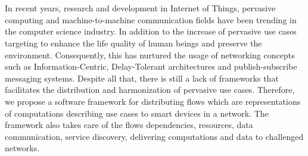 \chapter{\abstractname}
In recent years, research and development in Internet of Things, pervasive computing and machine-to-machine communication fields have been trending  in the computer science industry. In addition to the increase of pervasive use cases targeting to enhance the  life quality of human beings and preserve the environment. Consequently, this has nurtured  the usage of networking concepts such as Information-Centric, Delay-Tolerant architectures and publish-subscribe messaging systems.  Despite all that, there is still a lack of frameworks that facilitates the distribution and harmonization of pervasive use cases. Therefore, we propose a software framework for distributing flows which are representations of computations describing use cases to smart devices in a network. The framework also takes care of the flows dependencies, resources, data communication, service discovery, delivering computations and data to challenged networks.


